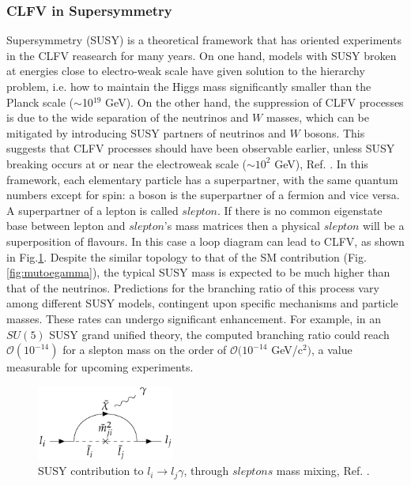\subsubsection{CLFV in Supersymmetry}\label{susy}
Supersymmetry (SUSY) is a theoretical framework that has oriented experiments in the CLFV reasearch for many years. On one hand, models with SUSY broken at energies close to electro-weak scale have given solution to the hierarchy problem, i.e. how to maintain the Higgs mass significantly smaller than the Planck scale ($\sim$10$^{19}$ GeV). On the other hand, the suppression of CLFV processes is due to the wide separation of the neutrinos and $W$ masses, which can be mitigated by introducing SUSY partners of neutrinos and $W$ bosons. This suggests that CLFV processes should have been observable earlier, unless SUSY breaking occurs at or near the electroweak scale ($\sim 10^2$ GeV), Ref. \cite{clfv_signorelli}. In this framework, each elementary particle has a superpartner,  with the same quantum numbers except for spin: a boson is the superpartner of a fermion and vice versa. A superpartner of a lepton is called $slepton$. If there is no common eigenstate base between lepton and $slepton$'s mass matrices then a physical $slepton$ will be a superposition of flavours. In this case a loop diagram can lead to CLFV, as shown in Fig.\ref{fig:susy}. Despite the similar topology to that of the SM contribution (Fig.\ref{fig:mutoegamma}), the typical SUSY mass is expected to be much higher than that of the neutrinos. Predictions for the branching ratio of this process vary among different SUSY models, contingent upon specific mechanisms and particle masses. These rates can undergo significant enhancement. For example, in an $SU(5)$ SUSY grand unified theory, the computed branching ratio could reach $\mathcal{O}(10^{-14})$ for a slepton mass on the order of $\mathcal{O}(10^{-14}$ GeV/c$^2)$, a value measurable for upcoming experiments.

\begin{figure}[!h]
\centering
\includegraphics[width =0.4\textwidth]{figures/png/Screenshot_20240218_105920.png}
\caption{SUSY contribution to $l_i \rightarrow l_j\gamma$, through $sleptons$ mass mixing, Ref. \cite{universe8060299}.}
\label{fig:susy}
\end{figure}


